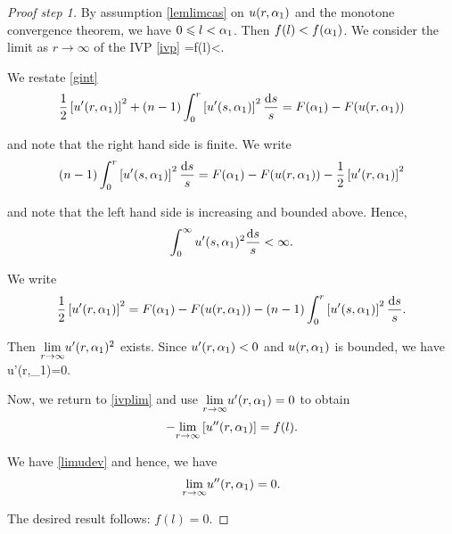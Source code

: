 \begin{proof}[Proof step 1] 
By assumption \eqref{lemlimcas} on $u(r,\alpha_1)$ and the monotone convergence
theorem, we have $0\leqslant l<\alpha_1$. Then $f(l)<f(\alpha_1)$. We consider the
limit as $r\to\infty$ of the IVP \eqref{ivp}
\be \label{ivplim}
\limrtoinf{}=f(l)<\infty.
\ee


We restate \cref{gint}
\[
\frac{1}{2}\left[u'(r,\alpha_1)\right]^2
+(n-1)\int_0^r\left[u'(s,\alpha_1)\right]^2\frac{\mathop{}\!\mathrm{d} s}{s}=
F(\alpha_1)-F(u(r,\alpha_1))
\]

and note that the right hand side is finite. We write
\[
(n-1)\int_0^r\left[u'(s,\alpha_1)\right]^2\frac{\mathop{}\!\mathrm{d} s}{s}
= F(\alpha_1) - F(u(r,\alpha_1))- 
\frac{1}{2}\left[u'(r,\alpha_1)\right]^2
\]

and note that the left hand side is increasing and bounded above. Hence,
\[
\int_0^\infty u'(s,\alpha_1)^2 \frac{\mathop{}\!\mathrm{d} s}{s}<\infty.
\]

We write 
\[
\frac{1}{2}\left[u'(r,\alpha_1)\right]^2
= F(\alpha_1)-F(u(r,\alpha_1))
-(n-1)\int_0^r\left[u'(s,\alpha_1)\right]^2\frac{\mathop{}\!\mathrm{d} s}{s}.
\]

Then $\underset{r\to\infty}{\lim} u'(r,\alpha_1)^2$ exists. Since $u'(r,\alpha_1)<0$
and $u(r,\alpha_1)$ is bounded, we have 
\be \label{limudev}
 u'(r,\a_1)=0. 
\ee



Now, we return to \cref{ivplim} and use $\underset{r\to\infty}{\lim} u'(r,\alpha_1)=0$ to obtain
%
% 
\[ -\underset{r\to\infty}{\lim}\left[u''(r,\alpha_1)\right]=f(l).\]
%

We have \eqref{limudev} and hence, we have
$$\underset{r\to\infty}{\lim} u''(r,\alpha_1)=0.$$ 

The desired result follows: $f(l)=0$.
\end{proof}

